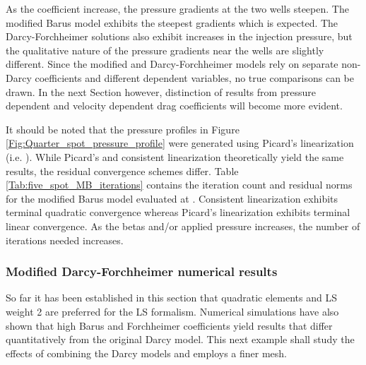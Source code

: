\documentclass[11pt,reqno]{amsart}
\begin{document}
As the coefficient  increase, the pressure gradients at the two wells 
steepen. The modified Barus model exhibits the steepest gradients which is expected.
The Darcy-Forchheimer solutions also exhibit increases in the injection pressure, but the 
qualitative nature of the pressure gradients near the wells are slightly different. Since
the modified and Darcy-Forchheimer models rely on separate non-Darcy coefficients and 
different dependent variables, no true comparisons can be drawn. In the next 
Section however, distinction of results from pressure dependent and velocity dependent 
drag coefficients will become more evident.

It should be noted that the pressure profiles in Figure 
\ref{Fig:Quarter_spot_pressure_profile} were generated using Picard's 
linearization (i.e. ). While Picard's 
and consistent linearization theoretically yield the same results, the 
residual convergence schemes differ. Table \ref{Tab:five_spot_MB_iterations} 
contains the iteration count and residual norms for the modified Barus model 
evaluated at . Consistent linearization exhibits 
terminal quadratic convergence whereas Picard's linearization exhibits terminal
linear convergence. As the betas and/or applied pressure increases, the number
of iterations needed increases.

\subsubsection{Modified Darcy-Forchheimer numerical results}
So far it has been established in this section that quadratic elements and LS weight 2 
are preferred for the LS formalism. Numerical simulations have also 
shown that high Barus and Forchheimer coefficients yield results that differ 
quantitatively from the original Darcy model. This next example shall study
the effects of combining the Darcy models and employs a finer mesh.
\end{document}
